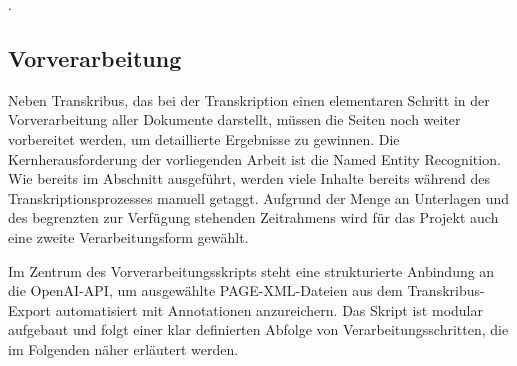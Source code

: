 \documentclass[12pt, a4paper, ngerman, bidi=default]{article}
\begin{document}
{
  }
  \label{fig:pipeline-uebersicht}
\vspace{\baselineskip}
\justifying. %

\subsection{Vorverarbeitung}\label{subsec:preprocessing}
Neben Transkribus, das bei der Transkription einen elementaren Schritt in der Vorverarbeitung aller Dokumente darstellt,
müssen die Seiten noch weiter vorbereitet werden, um detaillierte Ergebnisse zu gewinnen. Die Kernherausforderung der vorliegenden Arbeit ist die Named Entity Recognition. Wie bereits 
im Abschnitt  ausgeführt, werden viele Inhalte bereits während des Transkriptionsprozesses manuell getaggt. 
Aufgrund der Menge
an Unterlagen und des begrenzten zur Verfügung stehenden Zeitrahmens wird für das Projekt auch eine zweite Verarbeitungsform gewählt.

Im Zentrum des Vorverarbeitungsskripts steht eine strukturierte Anbindung an die OpenAI-API, um ausgewählte 
PAGE-XML-Dateien aus dem Transkribus-Export automatisiert mit Annotationen anzureichern. Das Skript ist modular
 aufgebaut und folgt einer klar definierten Abfolge von Verarbeitungsschritten, die im Folgenden näher erläutert werden.
\end{document}
